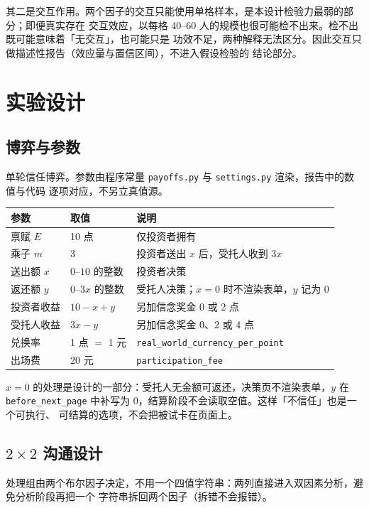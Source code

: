 \documentclass[10pt,a4paper]{ctexart}
\newcommand{\code}[1]{\texttt{#1}}
\begin{document}
其二是交互作用。两个因子的交互只能使用单格样本，是本设计检验力最弱的部分；即便真实存在
交互效应，以每格 40--60 人的规模也很可能检不出来。检不出既可能意味着「无交互」，也可能只是
功效不足，两种解释无法区分。因此交互只做描述性报告（效应量与置信区间），不进入假设检验的
结论部分。

\section{实验设计}\label{sec:design}

\subsection{博弈与参数}

单轮信任博弈。参数由程序常量 \code{payoffs.py} 与 \code{settings.py} 渲染，报告中的数值与代码
逐项对应，不另立真值源。

\begin{table}[h]
\centering\small
\begin{tabular}{lll}
\toprule
参数 & 取值 & 说明 \\
\midrule
禀赋 $E$ & 10 点 & 仅投资者拥有 \\
乘子 $m$ & 3 & 投资者送出 $x$ 后，受托人收到 $3x$ \\
送出额 $x$ & $0$--$10$ 的整数 & 投资者决策 \\
返还额 $y$ & $0$--$3x$ 的整数 & 受托人决策；$x=0$ 时不渲染表单，$y$ 记为 0 \\
投资者收益 & $10-x+y$ & 另加信念奖金 0 或 2 点 \\
受托人收益 & $3x-y$ & 另加信念奖金 0、2 或 4 点 \\
兑换率 & 1 点 $=$ 1 元 & \code{real\_world\_currency\_per\_point} \\
出场费 & 20 元 & \code{participation\_fee} \\
\bottomrule
\end{tabular}
\end{table}

$x=0$ 的处理是设计的一部分：受托人无金额可返还，决策页不渲染表单，$y$ 在
\code{before\_next\_page} 中补写为 0，结算阶段不会读取空值。这样「不信任」也是一个可执行、
可结算的选项，不会把被试卡在页面上。

\subsection{$2\times2$ 沟通设计}

处理组由两个布尔因子决定，不用一个四值字符串：两列直接进入双因素分析，避免分析阶段再把一个
字符串拆回两个因子（拆错不会报错）。
\end{document}
